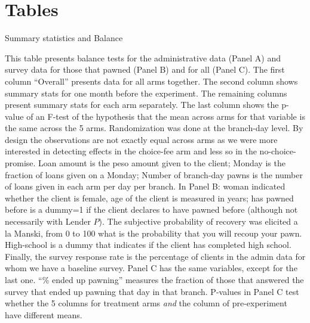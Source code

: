 \documentclass[oneside,11pt]{article}
\begin{document}
\clearpage

%
%






\newpage
\singlespacing

\section{Tables}


\begin{table}[H]
\caption{Summary statistics and Balance}
\label{SS}
\begin{center}
\scriptsize{}
\end{center}
 \scriptsize

\end{table}

\scriptsize {
\noindent This table presents balance tests for the administrative data (Panel A) and survey data for those that pawned (Panel B) and for all (Panel C). The first column ``Overall'' presents data for all arms together. The second column shows summary stats for one month before the experiment. The remaining columns present summary stats  for each arm separately. The last column shows the p-value of an F-test of the hypothesis that the mean across arms for that variable is the same across the 5 arms. Randomization was done at the branch-day level. By design the observations are not exactly equal across arms as we were more interested in detecting effects in the choice-fee arm and less so in the no-choice-promise. Loan amount is the peso amount given to the client; Monday is the fraction of loans given on a Monday; Number of branch-day pawns is the number of loans given in each arm per day per branch.  In Panel B: woman indicated whether the client is female, age of the client is measured in years; has pawned before is a dummy=1 if the client declares to have pawned before (although not necessarily with Lender $P$). The subjective probability of recovery was elicited a la Manski, from 0 to 100 what is the probability that you will recoup your pawn. High-school is a dummy that indicates if the client has completed high school. Finally, the survey response rate is the percentage of clients in the admin data for whom we have a baseline survey. Panel C has the same variables, except for the last one. ``\% ended up pawning'' measures the fraction of those that answered the survey that ended up pawning that day in that branch.  P-values in Panel C test whether the 5 columns for treatment arms \textit{and} the column of pre-experiment have different means.
}
\end{document}
